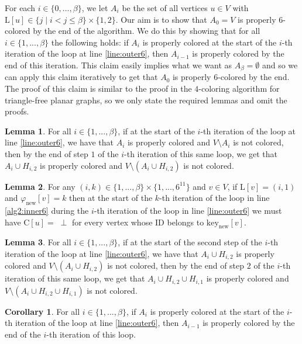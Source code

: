 \documentclass{article}
\theoremstyle{definition}
\newtheorem{corollary}{Corollary}[section]
\newtheorem{lemma}{Lemma}[section]
\begin{document}
For each $i \in \{0, ..., \beta\}$, we let $A_i$ be the set of all vertices $u \in V$ with $\text{L}[u] \in \{j \mid i < j \le \beta\} \times \{1,2\}$. Our aim is to show that $A_{0} = V$  is properly $6$-colored by the end of the algorithm. We do this by showing that for all $i \in \{1,...,\beta\}$ the following holds: if $A_{i}$ is properly colored at the start of the $i$-th iteration of the loop at line \ref{line:outer6}, then $A_{i-1}$ is properly colored by the end of this iteration. This claim easily implies what we want as $A_{\beta} = \emptyset$ and so we can apply this claim iteratively to get that $A_{0}$ is properly $6$-colored by the end. The proof of this claim is similar to the proof in the $4$-coloring algorithm for triangle-free planar graphs, so we only state the required lemmas and omit the proofs.

\begin{lemma}  For all $i \in \{1, ..., \beta\}$, if at the start of the $i$-th iteration of the loop at line \ref{line:outer6}, we have that $A_i$ is properly colored and $V \setminus A_i$ is not colored, then by the end of step $1$ of the $i$-th iteration of this same loop, we get that $A_i \cup H_{i,2}$ is properly colored and $V \setminus (A_i \cup H_{i,2})$ is not colored.\end{lemma}

\begin{lemma} For any $(i,k) \in \{1, ..., \beta\} \times \{1, ..., 6^{11}\}$ and $v \in V$, if $\text{L}[v] = (i,1)$ and $\varphi_{\text{new}}[v] = k$ then at the start of the $k$-th iteration of the loop in line \ref{alg2:inner6} during the $i$-th iteration of the loop in line \ref{line:outer6} we must have $\text{C}[u] = \; \perp$ for every vertex whose ID belongs to $\text{key}_{\text{new}}[v]$.\end{lemma}

\begin{lemma}  For all $i \in \{1, ..., \beta\}$, if at the start of the second step of the $i$-th iteration of the loop at line \ref{line:outer6}, we have that $A_i \cup H_{i,2}$ is properly colored and $V \setminus (A_i \cup H_{i,2})$ is not colored, then by the end of step $2$ of the $i$-th iteration of this same loop, we get that $A_i \cup H_{i,2} \cup H_{i,1}$ is properly colored and $V \setminus (A_i \cup H_{i,2} \cup H_{i,1})$ is not colored.\end{lemma}

\begin{corollary}  For all $i \in \{1, ..., \beta\}$, if $A_{i}$ is properly colored at the start of the $i$-th iteration of the loop at line \ref{line:outer6}, then $A_{i-1}$ is properly colored by the end of the $i$-th iteration of this loop.\end{corollary}
\end{document}
